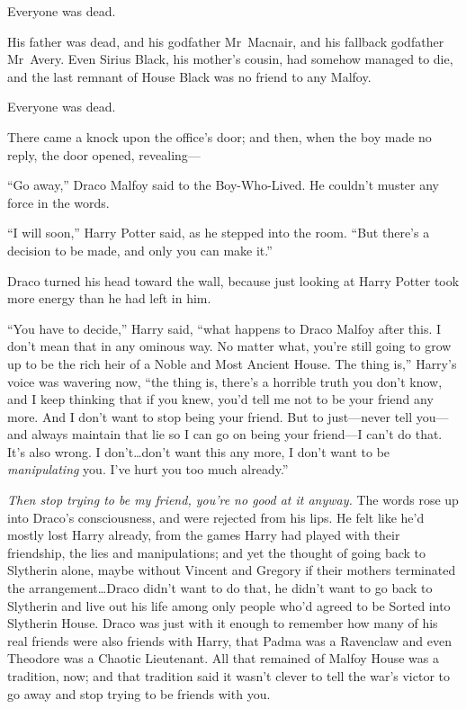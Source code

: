 Everyone was dead.

His father was dead, and his godfather Mr~Macnair, and his fallback godfather Mr~Avery. Even Sirius Black, his mother’s cousin, had somehow managed to die, and the last remnant of House Black was no friend to any Malfoy.

Everyone was dead.

There came a knock upon the office’s door; and then, when the boy made no reply, the door opened, revealing—

“Go away,” Draco Malfoy said to the Boy-Who-Lived. He couldn’t muster any force in the words.

“I will soon,” Harry Potter said, as he stepped into the room. “But there’s a decision to be made, and only you can make it.”

Draco turned his head toward the wall, because just looking at Harry Potter took more energy than he had left in him.

“You have to decide,” Harry said, “what happens to Draco Malfoy after this. I don’t mean that in any ominous way. No matter what, you’re still going to grow up to be the rich heir of a Noble and Most Ancient House. The thing is,” Harry’s voice was wavering now, “the thing is, there’s a horrible truth you don’t know, and I keep thinking that if you knew, you’d tell me not to be your friend any more. And I don’t want to stop being your friend. But to just—never tell you—and always maintain that lie so I can go on being your friend—I can’t do that. It’s also wrong. I don’t…don’t want this any more, I don’t want to be \emph{manipulating} you. I’ve hurt you too much already.”

\emph{Then stop trying to be my friend, you’re no good at it anyway.} The words rose up into Draco’s consciousness, and were rejected from his lips. He felt like he’d mostly lost Harry already, from the games Harry had played with their friendship, the lies and manipulations; and yet the thought of going back to Slytherin alone, maybe without Vincent and Gregory if their mothers terminated the arrangement…Draco didn’t want to do that, he didn’t want to go back to Slytherin and live out his life among only people who’d agreed to be Sorted into Slytherin House. Draco was just with it enough to remember how many of his real friends were also friends with Harry, that Padma was a Ravenclaw and even Theodore was a Chaotic Lieutenant. All that remained of Malfoy House was a tradition, now; and that tradition said it wasn’t clever to tell the war’s victor to go away and stop trying to be friends with you.

